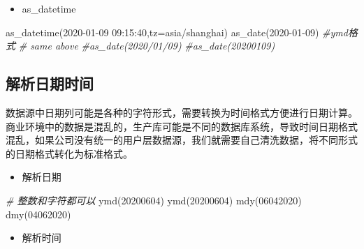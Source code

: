 \documentclass[
]{book}
\newenvironment{Shaded}{\begin{snugshade}}{\end{snugshade}}
\newcommand{\AttributeTok}[1]{\textcolor[rgb]{0.77,0.63,0.00}{#1}}
\newcommand{\CommentTok}[1]{\textcolor[rgb]{0.56,0.35,0.01}{\textit{#1}}}
\newcommand{\DecValTok}[1]{\textcolor[rgb]{0.00,0.00,0.81}{#1}}
\newcommand{\FunctionTok}[1]{\textcolor[rgb]{0.00,0.00,0.00}{#1}}
\newcommand{\NormalTok}[1]{#1}
\newcommand{\StringTok}[1]{\textcolor[rgb]{0.31,0.60,0.02}{#1}}
\providecommand{\tightlist}{%
  \setlength{\itemsep}{0pt}\setlength{\parskip}{0pt}}
\begin{document}
\begin{itemize}
\tightlist
\item
  as\_datetime
\end{itemize}

\begin{Shaded}
\begin{Highlighting}[]
\FunctionTok{as\_datetime}\NormalTok{(}\StringTok{\textquotesingle{}2020{-}01{-}09 09:15:40\textquotesingle{}}\NormalTok{,}\AttributeTok{tz=}\StringTok{\textquotesingle{}asia/shanghai\textquotesingle{}}\NormalTok{)}
\FunctionTok{as\_date}\NormalTok{(}\StringTok{\textquotesingle{}2020{-}01{-}09\textquotesingle{}}\NormalTok{) }\CommentTok{\#ymd格式}
\CommentTok{\# same above}
\CommentTok{\#as\_date(\textquotesingle{}2020/01/09\textquotesingle{})}
\CommentTok{\#as\_date(\textquotesingle{}20200109\textquotesingle{})}
\end{Highlighting}
\end{Shaded}

\hypertarget{parse-datetime}{%
\subsection{解析日期时间}\label{parse-datetime}}

数据源中日期列可能是各种的字符形式，需要转换为时间格式方便进行日期计算。商业环境中的数据是混乱的，生产库可能是不同的数据库系统，导致时间日期格式混乱，如果公司没有统一的用户层数据源，我们就需要自己清洗数据，将不同形式的日期格式转化为标准格式。

\begin{itemize}
\tightlist
\item
  解析日期
\end{itemize}

\begin{Shaded}
\begin{Highlighting}[]
\CommentTok{\# 整数和字符都可以}
\FunctionTok{ymd}\NormalTok{(}\DecValTok{20200604}\NormalTok{) }
\FunctionTok{ymd}\NormalTok{(}\StringTok{\textquotesingle{}20200604\textquotesingle{}}\NormalTok{)}
\FunctionTok{mdy}\NormalTok{(}\DecValTok{06042020}\NormalTok{)}
\FunctionTok{dmy}\NormalTok{(}\DecValTok{04062020}\NormalTok{)}
\end{Highlighting}
\end{Shaded}

\begin{itemize}
\tightlist
\item
  解析时间
\end{itemize}
\end{document}
